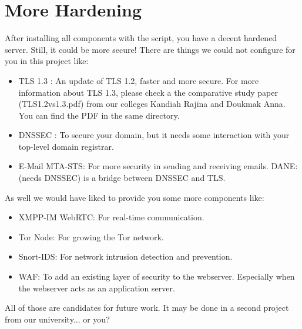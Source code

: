 \section{More Hardening} \label{more_hardening}
After installing all components with the script, you have a decent hardened server. Still, it could be more secure! There are things we could not configure for you in this project like: 
\begin{itemize}
	\item TLS 1.3 : An update of TLS 1.2, faster and more secure. \newline
	For more information about TLS 1.3, please check a the comparative study paper (TLS1.2vs1.3.pdf) from our colleges Kandiah Rajina and Doukmak Anna. You can find the PDF in the same directory. 
	\item \gls{DNSSEC} : To secure your domain, but it needs some interaction with your top-level domain registrar.
	\item E-Mail
	\subitem \gls{MTA-STS}: For more security in sending and receiving emails.
	\subitem \gls{DANE}: (needs DNSSEC) is a bridge between DNSSEC and TLS.
\end{itemize}
As well we would have liked to provide you some more components like:
\begin{itemize}
	\item XMPP-IM \gls{WebRTC}: For real-time communication.
	\item \gls{Tor} Node: For growing the Tor network.
	\item Snort-IDS: For network intrusion detection and prevention.
    \item \gls{WAF}: To add an existing layer of security to the webserver. Especially when the webserver acts as an application server.
\end{itemize}
All of those are candidates for future work. It may be done in a second project from our university... or you?
